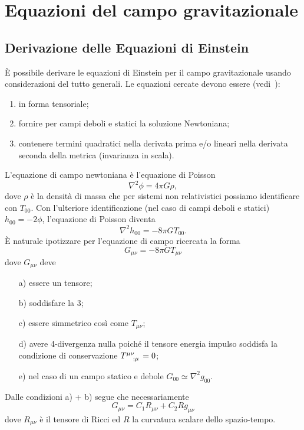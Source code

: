 \cleardoublepage

\chapter{Equazioni del campo gravitazionale}
\label{cha:equazioni-campo-grav}

\section{Derivazione delle Equazioni di Einstein}

È possibile derivare le equazioni di Einstein per il campo gravitazionale usando
considerazioni del tutto generali.  Le equazioni cercate devono essere
(vedi~\textcite[151]{weinberg:gravitation}):
\begin{enumerate}
\item in forma tensoriale;
\item fornire per campi deboli e statici la soluzione Newtoniana;
\item contenere termini quadratici nella derivata prima e/o lineari
  nella derivata seconda della metrica (invarianza in scala).
\end{enumerate}
L'equazione di campo newtoniana è l'equazione di Poisson
\begin{equation}
  \nabla^2 \phi = 4 \pi G \rho,
\end{equation}
dove $\rho$ è la densità di massa che per sistemi non relativistici possiamo
identificare con $T_{00}$.  Con l'ulteriore identificazione (nel caso di campi
deboli e statici) $h_{00} = - 2 \phi$, l'equazione di Poisson diventa
\begin{equation}
  \nabla^2 h_{00} = - 8 \pi G T_{00}.
\end{equation}
È naturale ipotizzare per l'equazione di campo ricercata la forma
\begin{equation}
  G_{\mu \nu} = - 8 \pi G T_{\mu \nu}
\end{equation}
dove $G_{\mu \nu}$ deve
\begin{itemize}
\item[a)] essere un tensore;
\item[b)] soddisfare la 3;
\item[c)] essere simmetrico così come $T_{\mu \nu}$;
\item[d)] avere 4-divergenza nulla poiché il tensore energia impulso soddisfa la
  condizione di conservazione $\tensor{T}{^{\mu \nu}_{; \mu}} =0$;
\item[e)] nel caso di un campo statico e debole $G_{00} \simeq \nabla^2 g_{00}$.
\end{itemize}
Dalle condizioni a) + b) segue che necessariamente
\begin{equation}
  \label{5.4}
  G_{\mu \nu} = C_1 R_{\mu \nu} + C_2 R g_{\mu \nu}
\end{equation}
dove $R_{\mu \nu}$ è il tensore di Ricci ed $R$ la curvatura scalare dello
spazio-tempo.

